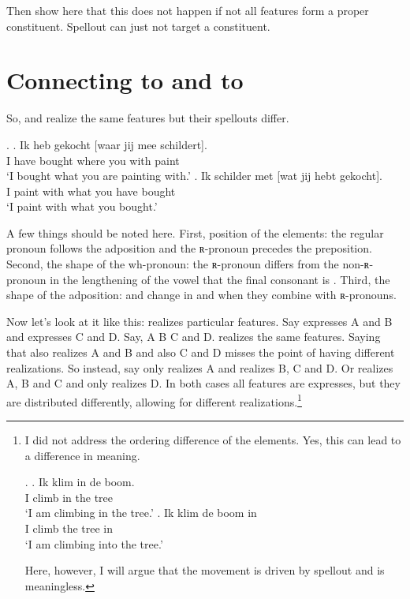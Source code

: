 \documentclass{article}
\begin{document}
Then show here that this does not happen if not all features form a proper constituent. Spellout can just not target a constituent.





\section{Connecting  to  and  to }

So,  and  realize the same features but their spellouts differ.

\ex.
\ag. Ik heb gekocht [waar jij mee schildert].\\
 I have bought where you with paint\\
 `I bought what you are painting with.'
\bg. Ik schilder met [wat jij hebt gekocht].\\
 I paint with what you have bought\\
 `I paint with what you bought.'

A few things should be noted here. First, position of the elements: the regular pronoun follows the adposition and the ʀ-pronoun precedes the preposition. Second, the shape of the wh-pronoun: the ʀ-pronoun differs from the non-ʀ-pronoun in the lengthening of the vowel that the final consonant is . Third, the shape of the adposition:  and  change in  and  when they combine with ʀ-pronouns.

Now let's look at it like this:  realizes particular features. Say  expresses A and B and  expresses C and D. Say, A B C and D.  realizes the same features. Saying that  also realizes A and B and  also C and D misses the point of having different realizations. So instead, say  only realizes A and  realizes B, C and D. Or  realizes A, B and C and  only realizes D. In both cases all features are expresses, but they are distributed differently, allowing for different realizations.\footnote{I did not address the ordering difference of the elements. Yes, this can lead to a difference in meaning.

\ex.
\ag. Ik klim in de boom.\\
 I climb in the tree\\
 `I am climbing in the tree.'
\bg. Ik klim de boom in\\
 I climb the tree in\\
 `I am climbing into the tree.'

Here, however, I will argue that the movement is driven by spellout and is meaningless.}
\end{document}
